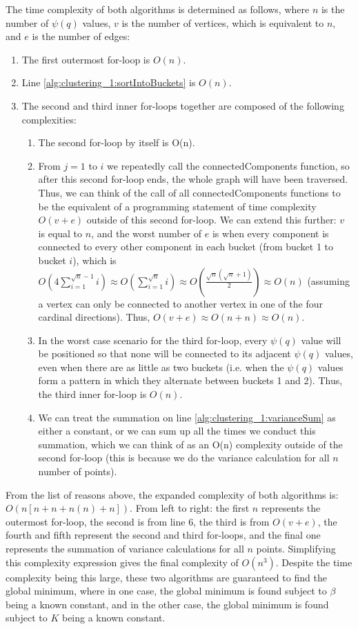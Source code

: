 \documentclass[conference]{IEEEtran}
\theoremstyle{plain}%
\begin{document}
The time complexity of both algorithms is determined as follows, where $n$ is the number of $\psi(q)$ values, $v$ is the number of vertices, which is equivalent to $n$, and $e$ is the number of edges:
\begin{enumerate}
\item The first outermost for-loop is $O(n)$.
\item Line \ref{alg:clustering_1:sortIntoBuckets} is $O(n)$.
\item The second and third inner for-loops together are composed of the following complexities:
\begin{enumerate}
\item The second for-loop by itself is O(n).
\item From $j= 1$ to $i$ we repeatedly call the connectedComponents function, so after this second for-loop ends, the whole graph will have been traversed. Thus, we can think of the call of all connectedComponents functions to be the equivalent of a programming statement of time complexity $O(v+e)$ outside of this second for-loop. We can extend this further: $v$ is equal to $n$, and the worst number of $e$ is when every component is connected to every other component in each bucket (from bucket 1 to bucket $i$), which is $O (4 \sum_{i=1}^{\sqrt{n}-1} i ) \approx O ( \sum_{i=1}^{\sqrt{n}} i ) \approx O( \frac{\sqrt{n}(\sqrt{n}+1)}{2} )\approx O(n)$ (assuming a vertex can only be connected to another vertex in one of the four cardinal directions). Thus, $O(v+e) \approx O(n+n) \approx O(n)$.
\item In the worst case scenario for the third for-loop, every $\psi(q)$ value will be positioned so that none will be connected to its adjacent $\psi(q)$ values, even when there are as little as two buckets (i.e. when the $\psi(q)$ values form a pattern in which they alternate between buckets 1 and 2). Thus, the third inner for-loop is $O(n)$.
\item We can treat the summation on line \ref{alg:clustering_1:varianceSum} as either a constant, or we can sum up all the times we conduct this summation, which we can think of as an O(n) complexity outside of the second for-loop (this is because we do the variance calculation for all $n$ number of points).
\end{enumerate}
\end{enumerate}
From the list of reasons above, the expanded complexity of both algorithms is: $O(n[n+n+n(n)+n])$. From left to right: the first $n$ represents the outermost for-loop, the second is from line 6, the third is from $O(v+e)$, the fourth and fifth represent the second and third for-loops, and the final one represents the summation of variance calculations for all $n$ points. Simplifying this complexity expression gives the final complexity of $O(n^3)$. Despite the time complexity being this large, these two algorithms are guaranteed to find the global minimum, where in one case, the global minimum is found subject to $\beta$ being a known constant, and in the other case, the global minimum is found subject to $K$ being a known constant.
\end{document}

